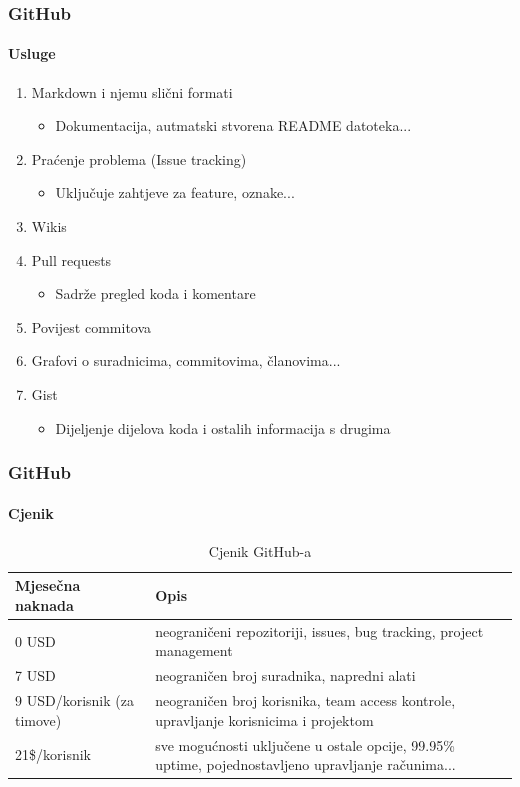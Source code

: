 \documentclass[12pt, hyperref={unicode}]{beamer}
\begin{document}
\begin{frame}
	\frametitle{GitHub}
	\framesubtitle{Usluge}
	\setlength{\leftmargini}{0.1in}
	\pause
	\begin{enumerate}
		\item Markdown i njemu slični formati
		\begin{itemize}
			\item Dokumentacija, autmatski stvorena README datoteka...
		\end{itemize}
		\pause
		\item Praćenje problema (Issue tracking)
		\begin{itemize}
			\item Uključuje zahtjeve za feature, oznake...
		\end{itemize}
		\pause
		\item Wikis
		\pause
		\item Pull requests
		\begin{itemize}
			\item Sadrže pregled koda i komentare
		\end{itemize}
		\pause
		\item Povijest commitova
		\pause
		\item Grafovi o suradnicima, commitovima, članovima...
		\pause
		\item Gist
		\begin{itemize}
			\item Dijeljenje dijelova koda i ostalih informacija s drugima
		\end{itemize}
	\end{enumerate}
\end{frame}

\begin{frame}[t]
	\frametitle{GitHub}
	\framesubtitle{Cjenik}
	\pause
	\begin{table}
		\footnotesize
		\begin{center}
		\caption{Cjenik GitHub-a}
		\begin{tabular}{|p{4cm}||p{5cm}|}
			\hline
			Mjesečna naknada & Opis \\
			\hline
			0 USD & neograničeni repozitoriji, issues, bug tracking, project management \\
			\hline
			7 USD & neograničen broj suradnika, napredni alati \\
			\hline
			9 USD/korisnik (za timove) & neograničen broj korisnika, team access kontrole, upravljanje korisnicima i projektom \\
			\hline
			21\$/korisnik & sve mogućnosti uključene u ostale opcije, 99.95\% uptime, pojednostavljeno upravljanje računima... \\
			\hline
		\end{tabular}
		\end{center}
	\end{table}
\end{frame}
\end{document}
